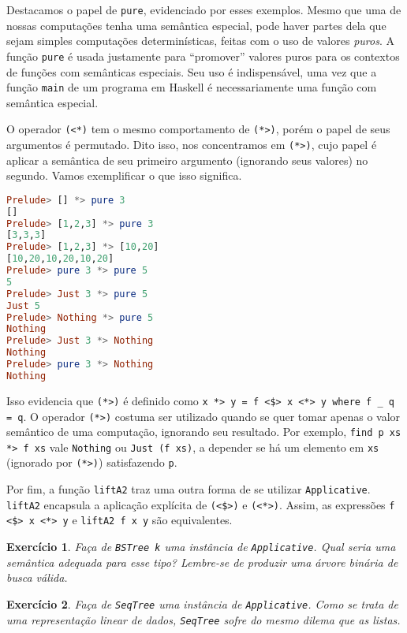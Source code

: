 \documentclass[a4paper]{article}
\newtheorem{exercicio}{Exercício}
\begin{document}
Destacamos o papel de \texttt{pure}, evidenciado por esses exemplos.
Mesmo que uma de nossas computações tenha uma semântica especial, pode haver partes dela que sejam simples computações determinísticas, feitas com o uso de valores \emph{puros}.
A função \texttt{pure} é usada justamente para ``promover'' valores puros para os contextos de funções com semânticas especiais.
Seu uso é indispensável, uma vez que a função \texttt{main} de um programa em Haskell é necessariamente uma função com semântica especial.

O operador \texttt{(<*)} tem o mesmo comportamento de \texttt{(*>)}, porém o papel de seus argumentos é permutado.
Dito isso, nos concentramos em \texttt{(*>)}, cujo papel é aplicar a semântica de seu primeiro argumento (ignorando seus valores) no segundo.
Vamos exemplificar o que isso significa.

\begin{lstlisting}[language=haskell, frame=single]
Prelude> [] *> pure 3
[]
Prelude> [1,2,3] *> pure 3
[3,3,3]
Prelude> [1,2,3] *> [10,20]
[10,20,10,20,10,20]
Prelude> pure 3 *> pure 5
5
Prelude> Just 3 *> pure 5
Just 5
Prelude> Nothing *> pure 5
Nothing
Prelude> Just 3 *> Nothing
Nothing
Prelude> pure 3 *> Nothing
Nothing
\end{lstlisting}

Isso evidencia que \texttt{(*>)} é definido como \texttt{x *> y = f <\$> x <*> y where f \_ q = q}.
O operador \texttt{(*>)} costuma ser utilizado quando se quer tomar apenas o valor semântico de uma computação, ignorando seu resultado.
Por exemplo, \texttt{find p xs *> f xs} vale \texttt{Nothing} ou \texttt{Just (f xs)}, a depender se  há um elemento em \texttt{xs} (ignorado por \texttt{(*>)}) satisfazendo \texttt{p}.

Por fim, a função \texttt{liftA2} traz uma outra forma de se utilizar \texttt{Applicative}.
\texttt{liftA2} encapsula a aplicação explícita de \texttt{(<\$>)} e \texttt{(<*>)}.
Assim, as expressões \texttt{f <\$> x <*> y} e \mbox{\texttt{liftA2 f x y}} são equivalentes.

\begin{exercicio}
	Faça de \emph{\texttt{BSTree k}} uma instância de \emph{\texttt{Applicative}}.
	Qual seria uma semântica adequada para esse tipo?
	Lembre-se de produzir uma árvore binária de busca válida.
\end{exercicio}

\begin{exercicio}
	Faça de \emph{\texttt{SeqTree}} uma instância de \emph{\texttt{Applicative}}.
	Como se trata de uma representação linear de dados, \emph{\texttt{SeqTree}} sofre do mesmo dilema que as listas.
\end{exercicio}
\end{document}

